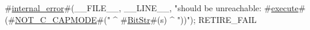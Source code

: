 #\hyperref[sailRISCVzinternalzyerror]{internal\_error}#(__FILE__, __LINE__, "should be unreachable: #\hyperref[sailRISCVzexecute]{execute}#(#\hyperref[sailRISCVzNOTzyCzyCAPMODE]{NOT\_C\_CAPMODE}#(" ^ #\hyperref[sailRISCVzBitStr]{BitStr}#(s) ^ "))");
RETIRE_FAIL
